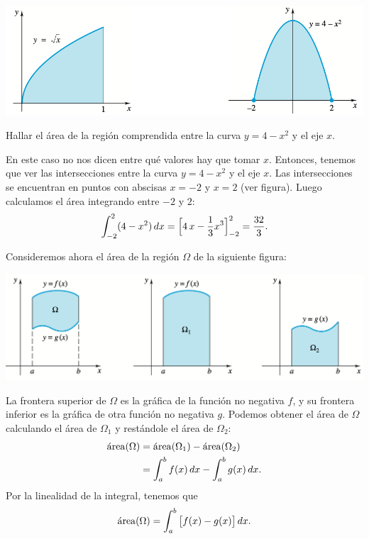 \centerline{\includegraphics[width=.9\textwidth]{pics/areas-1.png}}

\begin{example}
  Hallar el área de la región comprendida entre la curva $y=4-x^2$ y el eje $x$.

  En este caso no nos dicen entre qué valores hay que tomar $x$. Entonces, tenemos que ver las intersecciones entre la curva $y=4-x^2$ y el eje $x$. Las intersecciones se encuentran en puntos con abscisas $x=-2$ y $x=2$ (ver figura).
  Luego calculamos el área integrando entre $-2$ y $2$:
  \[
  \int_{-2}^2 (4-x^2)\,dx = \Big[ 4\, x-\frac13 x^3 \Big]_{-2}^2
  = \frac{32}3.
  \]
\end{example}

Consideremos ahora el área de la región $\Omega$ de la siguiente figura:

\centerline{\includegraphics[width=.9\textwidth]{pics/areas-2.png}}

La frontera superior de $\Omega$ es la gráfica de la función no negativa $f$, y su frontera inferior es la gráfica de otra función no negativa $g$. Podemos obtener el área de $\Omega$ calculando el área de $\Omega_1$ y restándole el área de $\Omega_2$:
\begin{align*}
  \mathrm{\protect\acute{a}rea}(\Omega)&=\mathrm{\protect\acute{a}rea}(\Omega_1)-\mathrm{\protect\acute{a}rea}(\Omega_2)\\
  &= \int_a^b f(x)\,dx - \int_a^b g(x)\,dx.
\end{align*}
Por la linealidad de la integral, tenemos que
\begin{equation}\label{eq:area entre dos curvas}
  \mathrm{\protect\acute{a}rea}(\Omega) = \int_a^b \big[f(x)-g(x)\big]\,dx.
\end{equation}

